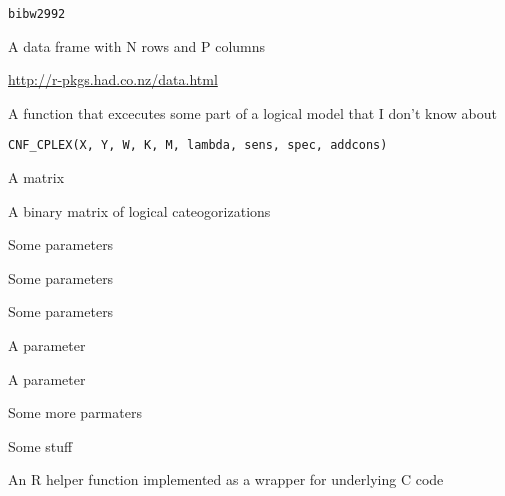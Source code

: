 \documentclass[letterpaper]{book}
\begin{document}
%
\begin{Usage}
\begin{verbatim}
bibw2992
\end{verbatim}
\end{Usage}
%
\begin{Format}
A data frame with N rows and P columns
\end{Format}
%
\begin{Source}\relax
\url{http://r-pkgs.had.co.nz/data.html}
\end{Source}
%
\begin{Description}\relax
A function that excecutes some part of a logical model that I don't know about
\end{Description}
%
\begin{Usage}
\begin{verbatim}
CNF_CPLEX(X, Y, W, K, M, lambda, sens, spec, addcons)
\end{verbatim}
\end{Usage}
%
\begin{Arguments}
\begin{ldescription}
\item[\code{X}] A matrix

\item[\code{Y}] A binary matrix of logical cateogorizations

\item[\code{W}] Some parameters

\item[\code{K}] Some parameters

\item[\code{M}] Some parameters

\item[\code{lambda}] A parameter

\item[\code{sens}] A parameter

\item[\code{spec}] Some more parmaters

\item[\code{addcons}] Some stuff
\end{ldescription}
\end{Arguments}
%
\begin{Description}\relax
An R helper function implemented as a wrapper for underlying C code
\end{Description}
\end{document}
